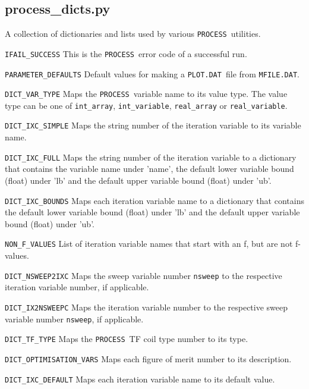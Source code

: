 \documentclass[11pt,a4paper]{article}
\newcommand{\mfile}{\mbox{\texttt{MFILE.DAT}}}
\newcommand{\plotdat}{\mbox{\texttt{PLOT.DAT}}}
\newcommand{\process}{\mbox{\texttt{PROCESS}}}
\begin{document}
\subsection{process\_dicts.py}

A collection of dictionaries and lists used by various \process\ utilities.

\begin{description}

\item{\verb|IFAIL_SUCCESS|} This is the \process\ error code of a successful
  run.

\item{\verb|PARAMETER_DEFAULTS|} Default values for making a \plotdat\ file
  from \mfile.

\item{\verb|DICT_VAR_TYPE|} Maps the \process\ variable name to its value
  type. The value type can be one of \verb|int_array|, \verb|int_variable|,
  \verb|real_array| or \verb|real_variable|.

\item{\verb|DICT_IXC_SIMPLE|} Maps the string number of the iteration variable
  to its variable name.

\item{\verb|DICT_IXC_FULL|} Maps the string number of the iteration variable
  to a dictionary that contains the variable name under 'name', the default
  lower variable bound (float) under 'lb' and the default upper variable bound
  (float) under 'ub'.

\item{\verb|DICT_IXC_BOUNDS|} Maps each iteration variable name to a
  dictionary that contains the default lower variable bound (float) under 'lb'
  and the default upper variable bound (float) under 'ub'.

\item{\verb|NON_F_VALUES|} List of iteration variable names that start with an
  f, but are not f-values.

\item{\verb|DICT_NSWEEP2IXC|} Maps the sweep variable number \texttt{nsweep}
  to the respective iteration variable number, if applicable.

\item{\verb|DICT_IX2NSWEEPC|} Maps the iteration variable number to the
  respective sweep variable number \texttt{nsweep}, if applicable.

\item{\verb|DICT_TF_TYPE|} Maps the \process\ TF coil type number to its type.

\item{\verb|DICT_OPTIMISATION_VARS|} Maps each figure of merit number to its
  description.

\item{\verb|DICT_IXC_DEFAULT|} Maps each iteration variable name to its
  default value.

\end{description}
\end{document}
